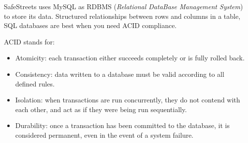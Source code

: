 SafeStreets uses MySQL as RDBMS (\textit{Relational DataBase Management System}) to store its data.
Structured relationships between rows and columns in a table, SQL databases are best when you need ACID compliance. 

ACID stands for:
\begin{itemize}
	\item Atomicity: each transaction either succeeds completely or is fully rolled back.
	\item Consistency: data written to a database must be valid according to all defined rules.
	\item Isolation:  when transactions are run concurrently, they do not contend with each other, and act as if they were being run sequentially.
	\item Durability: once a transaction has been committed to the database, it is considered permanent, even in the event of a system failure.
\end{itemize}






